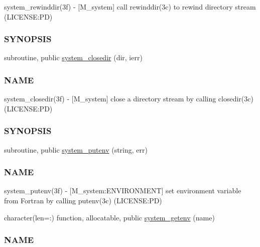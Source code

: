 \begin{DoxyCompactItemize}
\begin{DoxyCompactList}
system\+\_\+rewinddir(3f) -\/ \mbox{[}M\+\_\+system\mbox{]} call rewinddir(3c) to rewind directory stream (L\+I\+C\+E\+N\+SE\+:PD) \subsubsection*{S\+Y\+N\+O\+P\+S\+IS}\end{DoxyCompactList}\item 
subroutine, public \mbox{\hyperlink{namespacem__system_acd442b52c64fc50482bc08b0ac8a50d1}{system\+\_\+closedir}} (dir, ierr)
\begin{DoxyCompactList}\small\item\em \subsubsection*{N\+A\+ME}

system\+\_\+closedir(3f) -\/ \mbox{[}M\+\_\+system\mbox{]} close a directory stream by calling closedir(3c) (L\+I\+C\+E\+N\+SE\+:PD) \subsubsection*{S\+Y\+N\+O\+P\+S\+IS}\end{DoxyCompactList}\item 
subroutine, public \mbox{\hyperlink{namespacem__system_af0c9df8e59cac9cd617cd1e20448ea7d}{system\+\_\+putenv}} (string, err)
\begin{DoxyCompactList}\small\item\em \subsubsection*{N\+A\+ME}

system\+\_\+putenv(3f) -\/ \mbox{[}M\+\_\+system\+:E\+N\+V\+I\+R\+O\+N\+M\+E\+NT\mbox{]} set environment variable from Fortran by calling putenv(3c) (L\+I\+C\+E\+N\+SE\+:PD) \end{DoxyCompactList}\item 
character(len=\+:) function, allocatable, public \mbox{\hyperlink{namespacem__system_a15f307db605f8b332d4213814c0fb1a9}{system\+\_\+getenv}} (name)
\begin{DoxyCompactList}\small\item\em \subsubsection*{N\+A\+ME}


\end{DoxyCompactList}
\end{DoxyCompactItemize}

